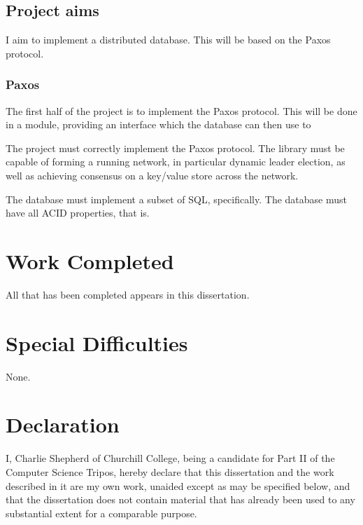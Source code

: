 \documentclass[12pt,twoside,notitlepage]{report}
\begin{document}
\subsection*{Project aims}

I aim to implement a distributed database. This will be based on the Paxos protocol.

\subsubsection*{Paxos}

The first half of the project is to implement the Paxos protocol. This will be done in a module,
providing an interface which the database can then use to 

The project must correctly implement the Paxos protocol.  The library must be capable of forming a
running network, in particular dynamic leader election, as well as achieving consensus on a
key/value store across the network.

The database must implement a subset of SQL, specifically. The database must have all ACID
properties, that is.

\section*{Work Completed}

All that has been completed appears in this dissertation.

\section*{Special Difficulties}

None.

\newpage
\section*{Declaration}

I, Charlie Shepherd of Churchill College, being a candidate for Part II of the Computer Science
Tripos, hereby declare that this dissertation and the work described in it are my own work,
unaided except as may be specified below, and that the dissertation does not contain material that
has already been used to any substantial extent for a comparable purpose.

\bigskip
{}

\medskip
{}

\cleardoublepage
\end{document}
